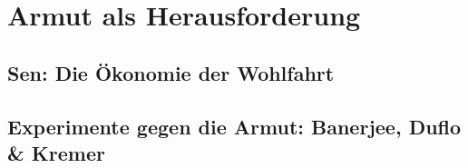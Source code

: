 %
%
%

\chapter{Armut als Herausforderung}
\label{Armut}

\section{Sen: Die Ökonomie der Wohlfahrt}


\section{Experimente gegen die Armut: Banerjee, Duflo \& Kremer}


